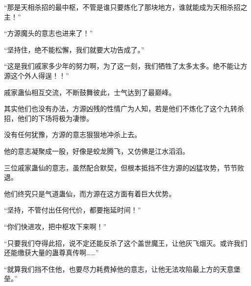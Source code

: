 \begin{this_body}
“那是天相杀招的最中枢，不管是谁只要炼化了那块地方，谁就能成为天相杀招之主！”

“方源魔头的意志也进来了！”

“坚持住，绝不能松懈，我们就要大功告成了。”

“这是我们戚家多少年的努力啊，为了这一刻，我们牺牲了太多太多。绝不能让方源这个外人得逞！！”

戚家蛊仙相互交流，不断鼓舞彼此，士气达到了最巅峰。

其实他们也没有办法，方源凶残的性情广为人知，若是他们不炼化了这个九转杀招，他们的下场将极为凄惨。

没有任何犹豫，方源的意志狠狠地冲杀上去。

他的意志凝聚成一股，好像是蛟龙腾飞，又仿佛是江水滔滔。

三位戚家蛊仙的意志，虽然配合默契，但根本抵挡不住方源的凶猛攻势，节节败退。

他们终究只是气道蛊仙，而方源在这方面有着巨大优势。

“坚持，不管付出任何代价，都要拖延时间！”

“你们快进攻，把中枢攻下来啊！”

“只要我们夺得此招，说不定还能反杀了这个盖世魔王，让他灰飞烟灭。或许我们还能缴获大量的蛊尊真传啊……”

“就算我们挡不住他，也要尽力耗费掉他的意志，让他无法攻陷最上方的天意堡垒。”

\end{this_body}

